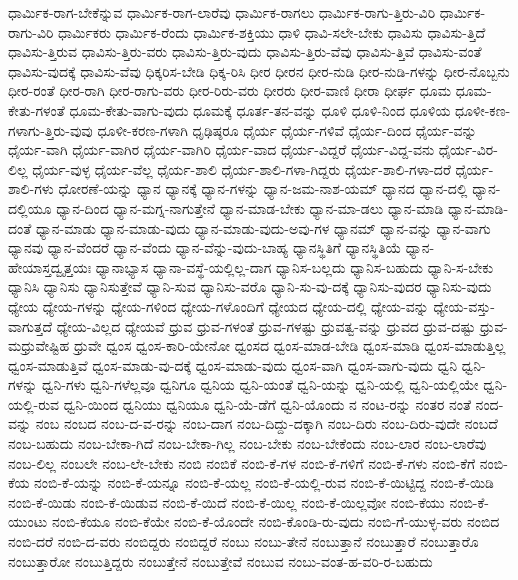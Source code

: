 {ಧಾರ್ಮಿಕ-ರಾಗ-ಬೇಕೆನ್ನುವ
ಧಾರ್ಮಿಕ-ರಾಗ-ಲಾರೆವು
ಧಾರ್ಮಿಕ-ರಾಗಲು
ಧಾರ್ಮಿಕ-ರಾಗು-ತ್ತಿರು-ವಿರಿ
ಧಾರ್ಮಿಕ-ರಾಗು-ವಿರಿ
ಧಾರ್ಮಿಕರು
ಧಾರ್ಮಿಕ-ರೆಂದು
ಧಾರ್ಮಿಕ-ಶಕ್ತಿಯು
ಧಾಳಿ
ಧಾವಿ-ಸಲೇ-ಬೇಕು
ಧಾವಿಸು
ಧಾವಿಸು-ತ್ತಿದೆ
ಧಾವಿಸು-ತ್ತಿರುವ
ಧಾವಿಸು-ತ್ತಿರು-ವರು
ಧಾವಿಸು-ತ್ತಿರು-ವುದು
ಧಾವಿಸು-ತ್ತಿರು-ವೆವು
ಧಾವಿಸು-ತ್ತಿವೆ
ಧಾವಿಸು-ವಂತೆ
ಧಾವಿಸು-ವುದಕ್ಕೆ
ಧಾವಿಸು-ವೆವು
ಧಿಕ್ಕರಿಸ-ಬೇಡಿ
ಧಿಕ್ಕ-ರಿಸಿ
ಧೀರ
ಧೀರನ
ಧೀರ-ನುಡಿ
ಧೀರ-ನುಡಿ-ಗಳನ್ನು
ಧೀರ-ನೊಬ್ಬನು
ಧೀರ-ರಂತೆ
ಧೀರ-ರಾಗಿ
ಧೀರ-ರಾಗು-ವರು
ಧೀರ-ರಿರು-ವರು
ಧೀರರು
ಧೀರ-ವಾಣಿ
ಧೀರಾ
ಧೀರ್ಘ
ಧೂಮ
ಧೂಮ-ಕೇತು-ಗಳಂತೆ
ಧೂಮ-ಕೇತು-ವಾಗು-ವುದು
ಧೂಮಕ್ಕೆ
ಧೂರ್ತ-ತನ-ವನ್ನು
ಧೂಳಿ
ಧೂಳಿ-ನಿಂದ
ಧೂಳಿಯ
ಧೂಳೀ-ಕಣ-ಗಳಾಗು-ತ್ತಿರು-ವುವು
ಧೂಳೀ-ಕರಣ-ಗಳಾಗಿ
ಧೃಢಿಷ್ಠರೂ
ಧೈರ್ಯ
ಧೈರ್ಯ-ಗಳಿವೆ
ಧೈರ್ಯ-ದಿಂದ
ಧೈರ್ಯ-ವನ್ನು
ಧೈರ್ಯ-ವಾಗಿ
ಧೈರ್ಯ-ವಾಗಿರ
ಧೈರ್ಯ-ವಾಗಿರಿ
ಧೈರ್ಯ-ವಾದ
ಧೈರ್ಯ-ವಿದ್ದರೆ
ಧೈರ್ಯ-ವಿದ್ದ-ವನು
ಧೈರ್ಯ-ವಿರ-ಲಿಲ್ಲ
ಧೈರ್ಯ-ವುಳ್ಳ
ಧೈರ್ಯ-ವೆಲ್ಲ
ಧೈರ್ಯ-ಶಾಲಿ
ಧೈರ್ಯ-ಶಾಲಿ-ಗಳಾ-ಗಿದ್ದರು
ಧೈರ್ಯ-ಶಾಲಿ-ಗಳಾ-ದರೆ
ಧೈರ್ಯ-ಶಾಲಿ-ಗಳು
ಧೋರಣೆ-ಯನ್ನು
ಧ್ಯಾನ
ಧ್ಯಾನಕ್ಕೆ
ಧ್ಯಾನ-ಗಳನ್ನು
ಧ್ಯಾನ-ಜಮ-ನಾಶ-ಯಮ್
ಧ್ಯಾನದ
ಧ್ಯಾನ-ದಲ್ಲಿ
ಧ್ಯಾನ-ದಲ್ಲಿಯೂ
ಧ್ಯಾನ-ದಿಂದ
ಧ್ಯಾನ-ಮಗ್ನ-ನಾಗುತ್ತೇನೆ
ಧ್ಯಾನ-ಮಾಡ-ಬೇಕು
ಧ್ಯಾನ-ಮಾ-ಡಲು
ಧ್ಯಾನ-ಮಾಡಿ
ಧ್ಯಾನ-ಮಾಡಿ-ದಂತೆ
ಧ್ಯಾನ-ಮಾಡು
ಧ್ಯಾನ-ಮಾಡು-ವುದು
ಧ್ಯಾನ-ಮಾಡು-ವುದು-ಅವು-ಗಳ
ಧ್ಯಾನಮ್
ಧ್ಯಾನ-ವನ್ನು
ಧ್ಯಾನ-ವಾಗು
ಧ್ಯಾನವು
ಧ್ಯಾನ-ವೆಂದರೆ
ಧ್ಯಾನ-ವೆಂದು
ಧ್ಯಾನ-ವೆನ್ನು-ವುದು-ಬಾಹ್ಯ
ಧ್ಯಾನಸ್ಥಿತಿಗೆ
ಧ್ಯಾನಸ್ಥಿತಿಯೆ
ಧ್ಯಾನ-ಹೇಯಾಸ್ತದ್ವೃತ್ತಯಃ
ಧ್ಯಾನಾಭ್ಯಾಸ
ಧ್ಯಾನಾ-ವಸ್ಥೆ-ಯಲ್ಲಿಲ್ಲ-ದಾಗ
ಧ್ಯಾನಿಸ-ಬಲ್ಲದು
ಧ್ಯಾನಿಸ-ಬಹುದು
ಧ್ಯಾನಿ-ಸ-ಬೇಕು
ಧ್ಯಾನಿಸಿ
ಧ್ಯಾನಿಸು
ಧ್ಯಾನಿಸುತ್ತೇವೆ
ಧ್ಯಾನಿ-ಸುವ
ಧ್ಯಾನಿಸು-ವರೊ
ಧ್ಯಾನಿ-ಸು-ವು-ದಕ್ಕೆ
ಧ್ಯಾನಿಸು-ವುದರ
ಧ್ಯಾನಿಸು-ವುದು
ಧ್ಯೇಯ
ಧ್ಯೇಯ-ಗಳನ್ನು
ಧ್ಯೇಯ-ಗಳಿಂದ
ಧ್ಯೇಯ-ಗಳೊಂದಿಗೆ
ಧ್ಯೇಯದ
ಧ್ಯೇಯ-ದಲ್ಲಿ
ಧ್ಯೇಯ-ವನ್ನು
ಧ್ಯೇಯ-ವಸ್ತು-ವಾಗುತ್ತದೆ
ಧ್ಯೇಯ-ವಿಲ್ಲದ
ಧ್ಯೇಯವೆ
ಧ್ರುವ
ಧ್ರುವ-ಗಳಂತೆ
ಧ್ರುವ-ಗಳಷ್ಟು
ಧ್ರುವತ್ವ-ವನ್ನು
ಧ್ರುವದ
ಧ್ರುವ-ದಷ್ಟು
ಧ್ರುವ-ಮಧ್ರುವೇಷ್ಟಿಹ
ಧ್ರುವೇ
ಧ್ವಂಸ
ಧ್ವಂಸ-ಕಾರಿ-ಯೇನೋ
ಧ್ವಂಸದ
ಧ್ವಂಸ-ಮಾಡ-ಬೇಡಿ
ಧ್ವಂಸ-ಮಾಡಿ
ಧ್ವಂಸ-ಮಾಡುತ್ತಿಲ್ಲ
ಧ್ವಂಸ-ಮಾಡುತ್ತಿವೆ
ಧ್ವಂಸ-ಮಾಡು-ವು-ದಕ್ಕೆ
ಧ್ವಂಸ-ಮಾಡು-ವುದು
ಧ್ವಂಸ-ವಾಗಿ
ಧ್ವಂಸ-ವಾಗು-ವುದು
ಧ್ವನಿ
ಧ್ವನಿ-ಗಳನ್ನು
ಧ್ವನಿ-ಗಳು
ಧ್ವನಿ-ಗಳೆಲ್ಲವೂ
ಧ್ವನಿಗೂ
ಧ್ವನಿಯ
ಧ್ವನಿ-ಯಂತೆ
ಧ್ವನಿ-ಯನ್ನು
ಧ್ವನಿ-ಯಲ್ಲಿ
ಧ್ವನಿ-ಯಲ್ಲಿಯೇ
ಧ್ವನಿ-ಯಲ್ಲಿ-ರುವ
ಧ್ವನಿ-ಯಿಂದ
ಧ್ವನಿಯು
ಧ್ವನಿಯೂ
ಧ್ವನಿ-ಯೆ-ಡೆಗೆ
ಧ್ವನಿ-ಯೊಂದು
ನ
ನಂಟ-ರನ್ನು
ನಂತರ
ನಂತೆ
ನಂದ-ವನ್ನು
ನಂಬ
ನಂಬದ
ನಂಬ-ದ-ವ-ರನ್ನು
ನಂಬ-ದಾಗ
ನಂಬ-ದಿದ್ದು-ದಕ್ಕಾಗಿ
ನಂಬ-ದಿರು
ನಂಬ-ದಿರು-ವುದೇ
ನಂಬದೆ
ನಂಬ-ಬಹುದು
ನಂಬ-ಬೇಕಾ-ಗಿದೆ
ನಂಬ-ಬೇಕಾ-ಗಿಲ್ಲ
ನಂಬ-ಬೇಕು
ನಂಬ-ಬೇಕೆಂದು
ನಂಬ-ಲಾರ
ನಂಬ-ಲಾರೆವು
ನಂಬ-ಲಿಲ್ಲ
ನಂಬಲೇ
ನಂಬ-ಲೇ-ಬೇಕು
ನಂಬಿ
ನಂಬಿಕೆ
ನಂಬಿ-ಕೆ-ಗಳ
ನಂಬಿ-ಕೆ-ಗಳಿಗೆ
ನಂಬಿ-ಕೆ-ಗಳು
ನಂಬಿ-ಕೆಗೆ
ನಂಬಿ-ಕೆಯ
ನಂಬಿ-ಕೆ-ಯನ್ನು
ನಂಬಿ-ಕೆ-ಯನ್ನೂ
ನಂಬಿ-ಕೆ-ಯಲ್ಲ
ನಂಬಿ-ಕೆ-ಯಲ್ಲಿ-ರುವ
ನಂಬಿ-ಕೆ-ಯಿಟ್ಟಿದ್ದ
ನಂಬಿ-ಕೆ-ಯಿಡಿ
ನಂಬಿ-ಕೆ-ಯಿಡು
ನಂಬಿ-ಕೆ-ಯಿಡುವ
ನಂಬಿ-ಕೆ-ಯಿದೆ
ನಂಬಿ-ಕೆ-ಯಿಲ್ಲ
ನಂಬಿ-ಕೆ-ಯಿಲ್ಲವೋ
ನಂಬಿ-ಕೆಯು
ನಂಬಿ-ಕೆ-ಯುಂಟು
ನಂಬಿ-ಕೆಯೂ
ನಂಬಿ-ಕೆಯೇ
ನಂಬಿ-ಕೆ-ಯೊಂದೇ
ನಂಬಿ-ಕೊಂಡಿ-ರು-ವುದು
ನಂಬಿ-ಗೆ-ಯುಳ್ಳ-ವರು
ನಂಬಿದ
ನಂಬಿ-ದರೆ
ನಂಬಿ-ದ-ವರು
ನಂಬಿದ್ದರು
ನಂಬಿದ್ದರೆ
ನಂಬು
ನಂಬು-ತೇನೆ
ನಂಬುತ್ತಾನೆ
ನಂಬುತ್ತಾರೆ
ನಂಬುತ್ತಾರೊ
ನಂಬುತ್ತಾರೋ
ನಂಬುತ್ತಿದ್ದರು
ನಂಬುತ್ತೇನೆ
ನಂಬುತ್ತೇವೆ
ನಂಬುವ
ನಂಬು-ವಂತ-ಹ-ವರಿ-ರ-ಬಹುದು
}
